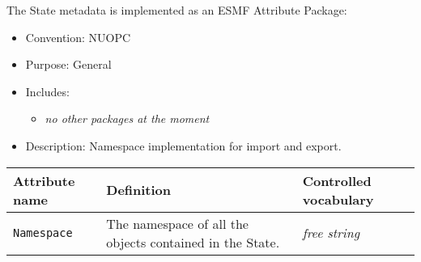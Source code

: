 \label{StateMeta}
The State metadata is implemented as an ESMF Attribute Package:

\begin{itemize}
    \item Convention: NUOPC
    \item Purpose: General
    \item Includes:
    \begin{itemize}
        \item {\em no other packages at the moment}
    \end{itemize} 
    \item Description: Namespace implementation for import and export. 
\end{itemize}

\begin{tabular}{|p{5cm}|p{5cm}|p{35mm}|}
     \hline\hline
     {\bf Attribute name} & {\bf Definition} & {\bf Controlled vocabulary}\\
     \hline\hline
     {\tt Namespace} & The namespace of all the objects contained in the State.& {\em free string}\\ \hline
     \hline
\end{tabular}
